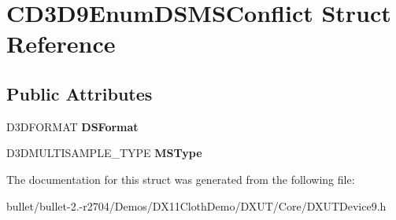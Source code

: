 \hypertarget{struct_c_d3_d9_enum_d_s_m_s_conflict}{\section{C\+D3\+D9\+Enum\+D\+S\+M\+S\+Conflict Struct Reference}
\label{struct_c_d3_d9_enum_d_s_m_s_conflict}
}
\subsection*{Public Attributes}
\begin{DoxyCompactItemize}
\item 
\hypertarget{struct_c_d3_d9_enum_d_s_m_s_conflict_a9d3d71fd4e8d1555dae4ba11e46a5641}{D3\+D\+F\+O\+R\+M\+A\+T {\bfseries D\+S\+Format}}\label{struct_c_d3_d9_enum_d_s_m_s_conflict_a9d3d71fd4e8d1555dae4ba11e46a5641}

\item 
\hypertarget{struct_c_d3_d9_enum_d_s_m_s_conflict_acf8253992ca1975167a922c1295e462f}{D3\+D\+M\+U\+L\+T\+I\+S\+A\+M\+P\+L\+E\+\_\+\+T\+Y\+P\+E {\bfseries M\+S\+Type}}\label{struct_c_d3_d9_enum_d_s_m_s_conflict_acf8253992ca1975167a922c1295e462f}

\end{DoxyCompactItemize}


The documentation for this struct was generated from the following file\+:\begin{DoxyCompactItemize}
\item 
bullet/bullet-\/2.-\/r2704/\+Demos/\+D\+X11\+Cloth\+Demo/\+D\+X\+U\+T/\+Core/D\+X\+U\+T\+Device9.\+h\end{DoxyCompactItemize}
